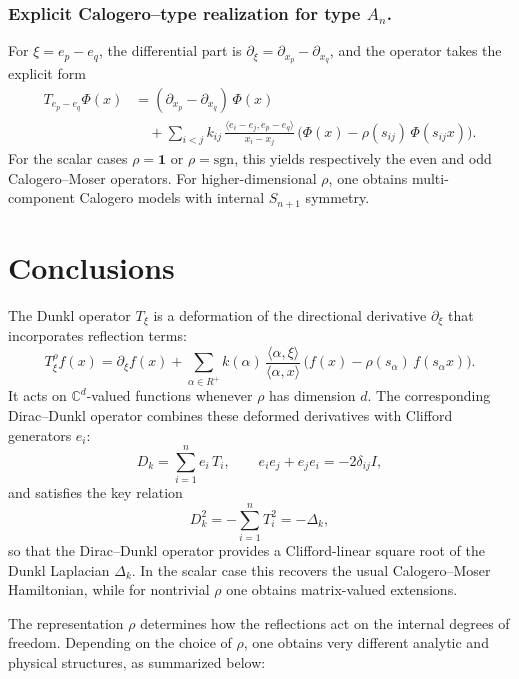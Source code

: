 \documentclass[12pt]{article}
\newcommand{\1}{\mathbbm{1}}
\theoremstyle{definition}
\begin{document}
\subsubsection{Explicit Calogero--type realization for type $A_n$.}
For $\xi = e_p - e_q$, the differential part is
$\partial_\xi = \partial_{x_p} - \partial_{x_q}$, and the operator takes the explicit form
\[
\begin{aligned}
T_{e_p-e_q}\Phi(x)
&= (\partial_{x_p} - \partial_{x_q})\,\Phi(x) \\[3pt]
&\quad+ \sum_{i<j} k_{ij}\,
  \frac{\langle e_i - e_j, e_p - e_q\rangle}{x_i - x_j}\,
  \big(\Phi(x) - \rho(s_{ij})\,\Phi(s_{ij}x)\big).
\end{aligned}
\]
For the scalar cases $\rho=\mathbf{1}$ or $\rho=\mathrm{sgn}$, this yields respectively
the even and odd Calogero--Moser operators. For higher-dimensional $\rho$, one obtains
multi-component Calogero models with internal $S_{n+1}$ symmetry.


\section{Conclusions}



The Dunkl operator $T_\xi$ is a deformation of the directional derivative
$\partial_\xi$ that incorporates reflection terms:
\[
  T_\xi^\rho f(x)
  = \partial_\xi f(x)
  + \sum_{\alpha\in R^+} k(\alpha)\,
    \frac{\langle \alpha,\xi\rangle}{\langle \alpha,x\rangle}\,
    \big(f(x) - \rho(s_\alpha)\,f(s_\alpha x)\big).
\]
It acts on $\mathbb{C}^d$-valued functions whenever $\rho$ has dimension $d$.
The corresponding Dirac--Dunkl operator combines these deformed derivatives
with Clifford generators $e_i$:
\[
  D_k = \sum_{i=1}^n e_i\,T_i,
  \qquad
  e_i e_j + e_j e_i = -2\delta_{ij} I,
\]
and satisfies the key relation
\[
  D_k^2 = -\sum_{i=1}^n T_i^2 = -\Delta_k,
\]
so that the Dirac--Dunkl operator provides a Clifford-linear square root
of the Dunkl Laplacian $\Delta_k$.  In the scalar case this recovers the usual
Calogero--Moser Hamiltonian, while for nontrivial $\rho$ one obtains
matrix-valued extensions.

The representation $\rho$ determines how the reflections act on the internal
degrees of freedom.  Depending on the choice of $\rho$, one obtains very
different analytic and physical structures, as summarized below:
\end{document}
